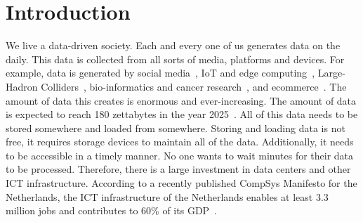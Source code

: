 \chapter{Introduction}
\label{sec:introduction}
We live a data-driven society. Each and every one of us generates data on the daily. This data is collected from all sorts of media, platforms and devices. For example, data is generated by social media~\cite{eberendu2016unstructured,jay20212facebook,vagata2014scaling}, IoT and edge computing~\cite{beierle2020data,sutherland2014forensic,bhatt2020next}, Large-Hadron Colliders~\cite{grange2022astronomical, avery2002data}, bio-informatics and cancer research~\cite{hinkson2017comprehensive,yang2015databases,greene2014big}, and ecommerce~\cite{akter2016big,ghandour2015big,patel2012addressing}. The amount of data this creates is enormous and ever-increasing. The amount of data is expected to reach 180 zettabytes in the year 2025~\cite{patrizio2018idc}. All of this data needs to be stored somewhere and loaded from somewhere. Storing and loading data is not free, it requires storage devices to maintain all of the data. Additionally, it needs to be accessible in a timely manner. No one wants to wait minutes for their data to be processed. Therefore, there is a large investment in data centers and other ICT infrastructure. According to a recently published CompSys Manifesto for the Netherlands, the ICT infrastructure of the Netherlands enables at least 3.3 million jobs and contributes to 60\% of its GDP~\cite{iosup2022future}. 

